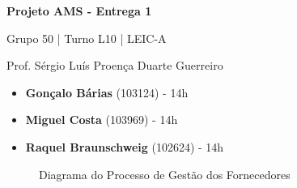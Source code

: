 \documentclass[12pt,a4paper]{article}
\begin{document}
\begin{titlepage}
  \begin{center}
    \vspace*{5cm}
    \Huge
    \textbf{Projeto AMS - Entrega 1}

    \vspace{0.5cm}
    \LARGE
    Grupo 50 | Turno L10 | LEIC-A

    \vspace{0.5cm}
    \large
    Prof. Sérgio Luís Proença Duarte Guerreiro

    \vfill
    \large
    \begin{minipage}{0.8\textwidth}
      \begin{itemize}
        \item[] \textbf{Gonçalo Bárias} (103124) - 14h
        \item[] \textbf{Miguel Costa} (103969) - 14h
        \item[] \textbf{Raquel Braunschweig} (102624) - 14h
      \end{itemize}
    \end{minipage}
  \end{center}
\end{titlepage}

%     
%
%     

\begin{landscape}
  \begin{figure}
    \centering
    
    \caption{Diagrama do Processo de Gestão dos Fornecedores}
    \label{fig:p1}
  \end{figure}
\end{landscape}

%     
\end{document}
